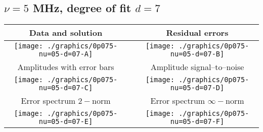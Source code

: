 

% 

\clearpage{}
\break{}

\subsection{$\nu = 5$ MHz, degree of fit $d = 7$}

\begin{table}[h]
    \begin{center}
        \begin{tabular}{ccc}
            Data and solution & \quad & Residual errors \\\hline
            \texttt{[image: ./graphics/0p075-nu=05-d=07-A]} &&
            \texttt{[image: ./graphics/0p075-nu=05-d=07-B]} \\[15pt]
            Amplitudes with error bars && Amplitude signal--to--noise \\\hline
            \texttt{[image: ./graphics/0p075-nu=05-d=07-C]} &&
            \texttt{[image: ./graphics/0p075-nu=05-d=07-D]} \\[15pt]
            Error spectrum $2-$norm && Error spectrum $\infty-$norm \\\hline
            \texttt{[image: ./graphics/0p075-nu=05-d=07-E]} &&
            \texttt{[image: ./graphics/0p075-nu=05-d=07-F]} \\[15pt]
        \end{tabular}
    \end{center}
\label{fig:elev=75, nu=5}
\end{table}



\endinput
